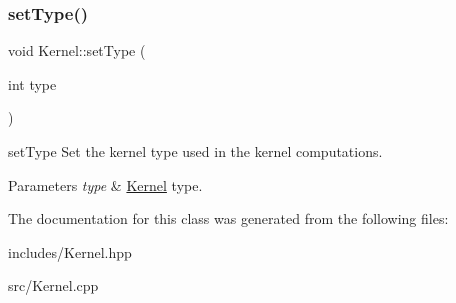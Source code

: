 \subsubsection{\texorpdfstring{set\+Type()}{setType()}}
{\footnotesize\ttfamily void Kernel\+::set\+Type (\begin{DoxyParamCaption}\item[{int}]{type }\end{DoxyParamCaption})}



set\+Type Set the kernel type used in the kernel computations. 


\begin{DoxyParams}{Parameters}
{\em type} & \hyperlink{class_kernel}{Kernel} type. \\
\hline
\end{DoxyParams}


The documentation for this class was generated from the following files\+:\begin{DoxyCompactItemize}
\item 
includes/Kernel.\+hpp\item 
src/Kernel.\+cpp\end{DoxyCompactItemize}

